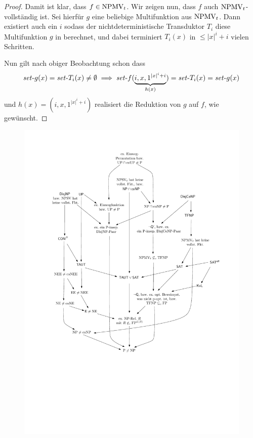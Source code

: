\begin{proof}
    Damit ist klar, dass $f\in\mathrm{NPMV}_t$.
    Wir zeigen nun, dass $f$ auch $\mathrm{NPMV}_t$-vollständig ist.
    Sei hierfür $g$ eine beliebige Multifunktion aus $\mathrm{NPMV}_t$.
    Dann existiert auch ein $i$ sodass der  nichtdeterministische Transduktor $T_i$ diese Multifunktion $g$ in berechnet, und dabei terminiert $T_i(x)$ in $\leq |x|^i+i$ vielen Schritten.

    Nun gilt nach obiger Beobachtung schon dass 
    \[ \mathit{set}\text{-}{g}(x) = \mathit{set}\text{-}{T_i}(x)\neq\emptyset \implies \mathit{set}\text{-}{f}(\underbrace{i, x, 1^{|x|^i+i}}_{h(x)})=\mathit{set}\text{-}{T_i}(x)=\mathit{set}\text{-}{g}(x) \]
    und $h(x)=(i, x, 1^{|x|^i+i})$ realisiert die Reduktion von $g$ auf $f$, wie gewünscht.
\end{proof}


\begin{figure}
    \centering\includegraphics[page=7]{figures.pdf}
    \caption{}
\end{figure}



